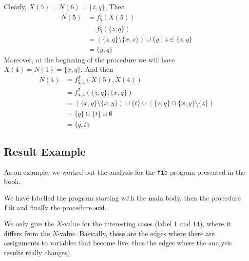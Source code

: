 \documentclass[a4wide,12pt]{article}
\theoremstyle{definition}
\theoremstyle{plain}
\theoremstyle{remark}
\begin{document}
Clearly, $X(5) = N(6) = \{z, q\}$. Then 
\begin{align*}
N(5)  & = f^1_5(X(5))  \\
      & = f^1_5(\{z,q\})  \\
      & = (\{z, q\} \setminus \{x, z\}) \cup \{y \mid z \in \{z, q\} \\
      & = \{y, q\} 
\end{align*}
Moreover, at the beginning of the procedure we will have $X(4) = N(1) = \{x, q\}$.
And then 
\begin{align*}
N(4) & = f^2_{5, 4} (X(5), X(4))  \\
     & = f^2_{5, 4} (\{z, q\}, \{x, q\}) \\
     & = (\{x, q\} \setminus \{x, y\}) \cup \{t\} \cup (\{z, q\} \cap \{x, y\} \setminus \{z\}) \\
     & = \{q\} \cup \{t\} \cup \emptyset \\
     & = \{q, t\}
\end{align*}

\subsection*{Result Example}

As an example, we worked out the analysis for the \texttt{fib} program presented in the book.

We have labelled the program starting with the main body, then
the procedure \texttt{fib} and finally the procedure \texttt{add}.

We only give the $X$-value for the interesting cases (label 1 and 14), where it differs
from the $N$-value. Basically, these are the edges where there are assignments to variables
that become live, thus the edges where the analysis results really changes).
\end{document}
